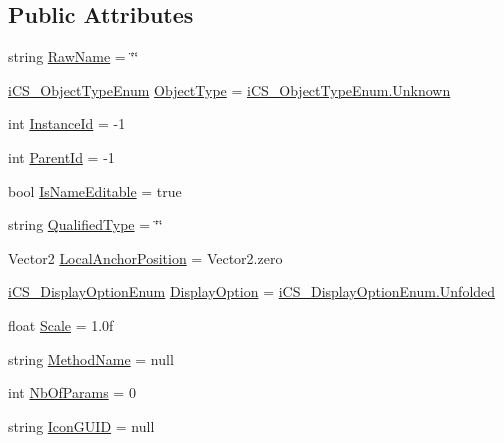 \subsection*{Public Attributes}
\begin{DoxyCompactItemize}
\item 
string \hyperlink{classi_c_s___engine_object_aba59370d81e07f27900233e9f7b3fbe4}{Raw\+Name} = \char`\"{}\char`\"{}
\item 
\hyperlink{i_c_s___object_type_enum_8cs_ae6c3dd6d8597380b56d94908eb431547}{i\+C\+S\+\_\+\+Object\+Type\+Enum} \hyperlink{classi_c_s___engine_object_ac3fa4f76b0a2e5ac665aaf1ff9be8ce8}{Object\+Type} = \hyperlink{i_c_s___object_type_enum_8cs_ae6c3dd6d8597380b56d94908eb431547a88183b946cc5f0e8c96b2e66e1c74a7e}{i\+C\+S\+\_\+\+Object\+Type\+Enum.\+Unknown}
\item 
int \hyperlink{classi_c_s___engine_object_a398fa6ad047699d80896459fe629d3cc}{Instance\+Id} = -\/1
\item 
int \hyperlink{classi_c_s___engine_object_abff4a026b7dd78aa1eec1d6cac051363}{Parent\+Id} = -\/1
\item 
bool \hyperlink{classi_c_s___engine_object_a4bf79b381a7e93639c64d0745df6d82f}{Is\+Name\+Editable} = true
\item 
string \hyperlink{classi_c_s___engine_object_afe4438ed340c068a9f86b24b53c5e2b0}{Qualified\+Type} = \char`\"{}\char`\"{}
\item 
Vector2 \hyperlink{classi_c_s___engine_object_a83490c7183dde7877042fba7143d2cf6}{Local\+Anchor\+Position} = Vector2.\+zero
\item 
\hyperlink{i_c_s___display_option_enum_8cs_adb6e65ba3359480d9b92851d847e9e1e}{i\+C\+S\+\_\+\+Display\+Option\+Enum} \hyperlink{classi_c_s___engine_object_a1751c4c32ddd121849d72e37e89f6213}{Display\+Option} = \hyperlink{i_c_s___display_option_enum_8cs_adb6e65ba3359480d9b92851d847e9e1ea581d00d30495540d09a1f5b2430baaca}{i\+C\+S\+\_\+\+Display\+Option\+Enum.\+Unfolded}
\item 
float \hyperlink{classi_c_s___engine_object_a8bc425a9c233d8ccb8bf1df3f2859e7f}{Scale} = 1.\+0f
\item 
string \hyperlink{classi_c_s___engine_object_ae367637ea25e7910b31464b1d241c2c4}{Method\+Name} = null
\item 
int \hyperlink{classi_c_s___engine_object_a76ccc2cc9f8a0caaff59584f84d134cd}{Nb\+Of\+Params} = 0
\item 
string \hyperlink{classi_c_s___engine_object_a73b91855bfa9af07ca71cb6e659c94ba}{Icon\+G\+U\+I\+D} = null
\item 

\end{DoxyCompactItemize}
